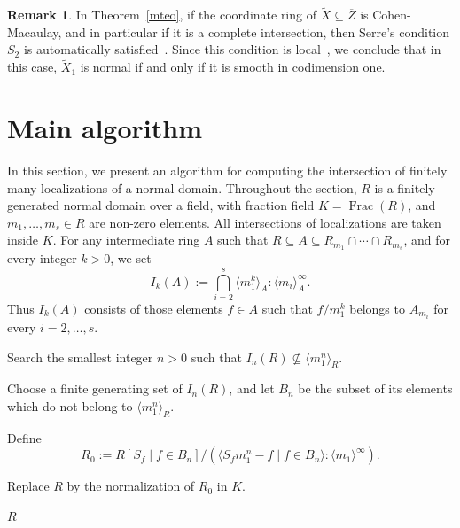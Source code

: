 \documentclass{amsart}
\theoremstyle{definition}
\newtheorem{remark}[theorem]{Remark}
\theoremstyle{remark}
\begin{document}
\begin{remark}
\label{rem:normal}
In Theorem~\ref{mteo}, if the coordinate ring of $\tilde{X} \subseteq \overline{Z}$ is Cohen-Macaulay, and in particular if it is a complete intersection, then Serre's condition $S_2$ is automatically satisfied~\cite[\href{https://stacks.math.columbia.edu/tag/0342}{Tag 0342}]{stacks-project}. Since this condition is local~\cite[\href{https://stacks.math.columbia.edu/tag/033Q}{Tag 033Q}]{stacks-project}, we conclude that in this case, $\tilde{X}_1$ is normal if and only if it is smooth in codimension one.
\end{remark}

\section{Main algorithm}
\label{sec:algorithm}

In this section, we present an algorithm for computing the intersection of
finitely many localizations of a normal domain. Throughout the section, $R$
is a finitely generated normal domain over a field, with fraction field
$K=\operatorname{Frac}(R)$, and $m_1,\dots,m_s\in R$ are non-zero elements.
All intersections of localizations are taken inside $K$.
For any intermediate ring $A$ such that
$R\subseteq A\subseteq R_{m_1}\cap\cdots\cap R_{m_s}$, and for every
integer $k>0$, we set
\[
 I_k(A):=
 \bigcap_{i=2}^s
 \langle m_1^k\rangle_A:\langle m_i\rangle_A^\infty .
\]
Thus $I_k(A)$ consists of those elements $f\in A$ such that
$f/m_1^k$ belongs to $A_{m_i}$ for every $i=2,\dots,s$.

\begin{algorithm}[H]
\label{alg}
\caption{Computing the intersection of localizations}

    {
        Search the smallest integer $n>0$ such that
        $I_n(R)\not\subseteq \langle m_1^n\rangle_R$.

        Choose a finite generating set of $I_n(R)$, and let $B_n$ be the
        subset of its elements which do not belong to $\langle m_1^n\rangle_R$.

        Define
        \[
        R_0 :=
        R[S_f\mid f\in B_n]\Big/
        \left(
        \langle S_fm_1^n-f\mid f\in B_n\rangle
        :\langle m_1\rangle^\infty
        \right).
        \]

        Replace $R$ by the normalization of $R_0$ in $K$.
    }

    \Return $R$\;
\end{algorithm}
\end{document}
